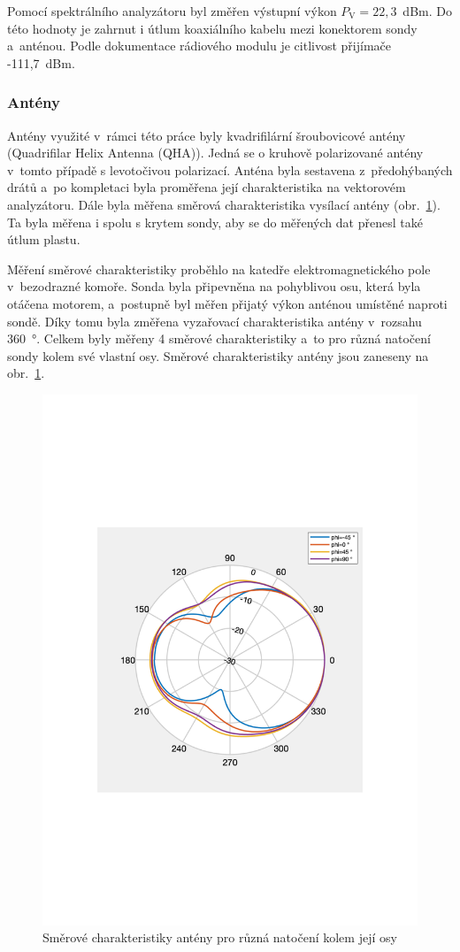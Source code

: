 \documentclass[twoside]{ctuthesis}
\newcommand{\mt}[1]{\text{#1}}
\theoremstyle{plain}
\theoremstyle{definition}
\theoremstyle{note}
\begin{document}
			Pomocí spektrálního analyzátoru byl změřen výstupní výkon $P_\mt{V} = 22{,}3$~dBm. Do této hodnoty je zahrnut i útlum koaxiálního kabelu mezi konektorem sondy a~anténou. Podle dokumentace rádiového modulu \cite{telit} je citlivost přijímače -111{,}7~dBm.

			\subsubsection{Antény}
			\label{sec:anteny}
			Antény využité v~rámci této práce byly kvadrifilární šroubovicové antény (Quadrifilar Helix Antenna (QHA)). Jedná se o kruhově polarizované antény v~tomto případě s levotočivou polarizací. Anténa byla sestavena z~předohýbaných drátů a~po kompletaci byla proměřena její charakteristika na vektorovém analyzátoru. Dále byla měřena směrová charakteristika vysílací antény (obr.~\ref{graph:radiation:char}). Ta byla měřena i spolu s krytem sondy, aby se do měřených dat přenesl také útlum plastu. 

			Měření směrové charakteristiky proběhlo na katedře elektromagnetického pole v~bezodrazné komoře. Sonda byla připevněna na pohyblivou osu, která byla otáčena motorem, a~postupně byl měřen přijatý výkon anténou umístěné naproti sondě. Díky tomu byla změřena vyzařovací charakteristika antény v~rozsahu 360~°. Celkem byly měřeny 4 směrové charakteristiky a~to pro různá natočení sondy kolem své vlastní osy. Směrové charakteristiky antény jsou zaneseny na obr.~\ref{graph:radiation:char}.

			\begin{figure}[hbtp]
				\centering
				\includegraphics[width=.5\textwidth]{Graphs/radiation_plot.pdf}
				\caption{Směrové charakteristiky antény pro různá natočení kolem její osy}
				\label{graph:radiation:char}
			\end{figure}
\end{document}
